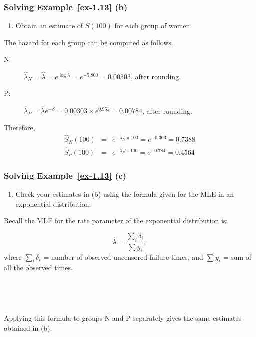 \documentclass{beamer}
\begin{document}
\begin{frame} \frametitle{Solving Example~\ref{ex-1.13} (b)}

\begin{enumerate}
\item [(b)] Obtain an estimate of $S(100)$ for each group of women.
\end{enumerate}

The hazard for each group can be computed as follows.

\begin{description}
\item[N:] $\hat{\lambda}_N =\hat{\lambda}= e^{\log\hat{\lambda}} = e^{-5.800}=0.00303$, after rounding.
\item[P:] $\hat{\lambda}_P = \hat{\lambda}e^{-\hat{\beta}} =0.00303\times e^{0.952}= 0.00784$, after rounding. 
\end{description}

Therefore, 
\begin{eqnarray*}
\hat{S}_N(100) &= & e^{-\hat{\lambda}_N\times 100}=e^{-0.303}=0.7388 \\  
\hat{S}_P(100) &= & e^{-\hat{\lambda}_P\times 100}=e^{-0.784}=0.4564
\end{eqnarray*}
\end{frame}



\begin{frame} \frametitle{Solving Example~\ref{ex-1.13} (c)}

\begin{enumerate}
\item [(c)] Check your estimates in (b) using the formula given for the MLE in an
  exponential distribution. 
\end{enumerate}

Recall the MLE for the rate parameter of
the exponential distribution is:

$$ \hat{\lambda} = \frac{\sum_i \delta_i}{\sum y_i}, $$
where $\sum_i \delta_i$ = number of observed uncensored failure times, and
$\sum y_i$ = sum of all the observed times.

\ \


\ \

Applying this formula to groups N and P separately gives the same estimates obtained in (b).
\end{frame}
\end{document}

